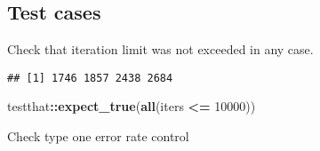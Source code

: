 \documentclass[]{book}
\newenvironment{Shaded}{\begin{snugshade}}{\end{snugshade}}
\newcommand{\ControlFlowTok}[1]{\textcolor[rgb]{0.13,0.29,0.53}{\textbf{#1}}}
\newcommand{\DecValTok}[1]{\textcolor[rgb]{0.00,0.00,0.81}{#1}}
\newcommand{\KeywordTok}[1]{\textcolor[rgb]{0.13,0.29,0.53}{\textbf{#1}}}
\newcommand{\NormalTok}[1]{#1}
\newcommand{\OperatorTok}[1]{\textcolor[rgb]{0.81,0.36,0.00}{\textbf{#1}}}
\newcommand{\StringTok}[1]{\textcolor[rgb]{0.31,0.60,0.02}{#1}}
\begin{document}
\hypertarget{test-cases-6}{%
\subsection{Test cases}\label{test-cases-6}}

Check that iteration limit was not exceeded in any case.

\begin{Shaded}
\end{Shaded}

\begin{verbatim}
## [1] 1746 1857 2438 2684
\end{verbatim}

\begin{Shaded}
\begin{Highlighting}[]
\NormalTok{testthat}\OperatorTok{::}\KeywordTok{expect_true}\NormalTok{(}\KeywordTok{all}\NormalTok{(iters }\OperatorTok{<=}\StringTok{ }\DecValTok{10000}\NormalTok{))}
\end{Highlighting}
\end{Shaded}

Check type one error rate control
\end{document}
